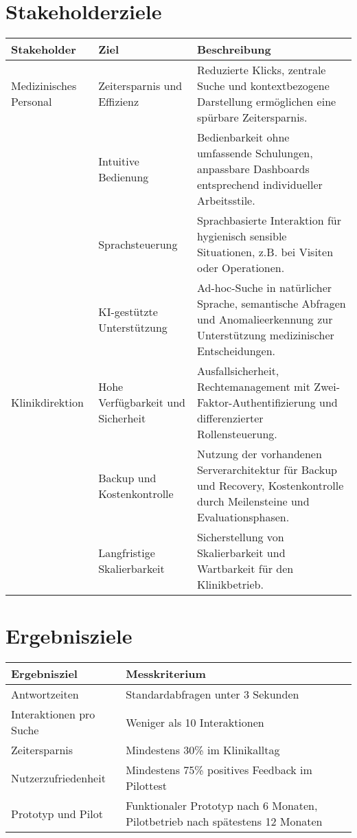 \section{Stakeholderziele}
\begin{center}
\begin{tabular}{|p{4cm}|p{5cm}|p{6cm}|}
	\hline
	\textbf{Stakeholder} & \textbf{Ziel} & \textbf{Beschreibung} \\
	\hline
	Medizinisches Personal & Zeitersparnis und Effizienz & Reduzierte Klicks, zentrale Suche und kontextbezogene Darstellung ermöglichen eine spürbare Zeitersparnis. \\
	
	& Intuitive Bedienung & Bedienbarkeit ohne umfassende Schulungen, anpassbare Dashboards entsprechend individueller Arbeitsstile. \\
	
	& Sprachsteuerung & Sprachbasierte Interaktion für hygienisch sensible Situationen, z.B. bei Visiten oder Operationen. \\
	
	& KI-gestützte Unterstützung & Ad-hoc-Suche in natürlicher Sprache, semantische Abfragen und Anomalieerkennung zur Unterstützung medizinischer Entscheidungen. \\
	\hline
	Klinikdirektion & Hohe Verfügbarkeit und Sicherheit & Ausfallsicherheit, Rechtemanagement mit Zwei-Faktor-Authentifizierung und differenzierter Rollensteuerung. \\
	
	 & Backup und Kostenkontrolle & Nutzung der vorhandenen Serverarchitektur für Backup und Recovery, Kostenkontrolle durch Meilensteine und Evaluationsphasen. \\
	
	 & Langfristige Skalierbarkeit & Sicherstellung von Skalierbarkeit und Wartbarkeit für den Klinikbetrieb. \\
	\hline
\end{tabular}
\end{center}


\section{Ergebnisziele}
\begin{center}
\begin{tabular}{|p{5cm}|p{10cm}|}
	\hline
	\textbf{Ergebnisziel} & \textbf{Messkriterium} \\
	\hline
	Antwortzeiten & Standardabfragen unter 3 Sekunden \\
	\hline
	Interaktionen pro Suche & Weniger als 10 Interaktionen \\
	\hline
	Zeitersparnis & Mindestens 30\% im Klinikalltag \\
	\hline
	Nutzerzufriedenheit & Mindestens 75\% positives Feedback im Pilottest \\
	\hline
	Prototyp und Pilot & Funktionaler Prototyp nach 6 Monaten, Pilotbetrieb nach spätestens 12 Monaten \\
	\hline
\end{tabular}
\end{center}


